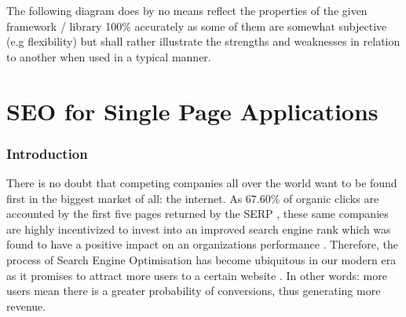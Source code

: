The following diagram does by no means reflect the properties of the given framework / library 100\% accurately as some of them are somewhat subjective (e.g flexibility) but shall rather illustrate the strengths and weaknesses in relation to another when used in a typical manner.

\newcommand\ColorBox[1]{\textcolor{#1}{\rule{2ex}{2ex}}}

\begin{center}
\end{center}


\section{SEO for Single Page Applications}

\subsubsection{Introduction}
There is no doubt that competing companies all over the world want to be found first in the biggest market of all: the internet. As 67.60\% of organic clicks are accounted by the first five pages returned by the SERP \cite{Khan2018:article}, these same companies are highly incentivized to invest into an improved search engine rank which was found to have a positive impact on an organizations performance \cite{yang2015search:article}. Therefore, the process of Search Engine Optimisation has become ubiquitous in our modern era as it promises to attract more users to a certain website \cite{Khan2018:article}. In other words: more users mean there is a greater probability of conversions, thus generating more revenue.

